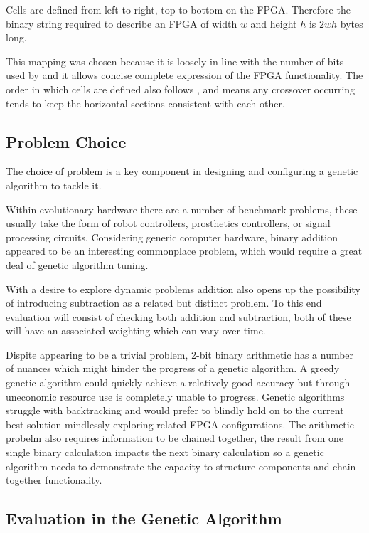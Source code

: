 Cells are defined from left to right, top to bottom on the FPGA. Therefore the
binary string required to describe an FPGA of width $w$ and height $h$ is $2wh$
bytes long.

This mapping was chosen because it is loosely in line with the number of bits
used by \cite{10.1007/3-540-63173-9_61} and it allows concise complete expression of
the FPGA functionality. The order in which cells are defined also follows
\cite{10.1007/3-540-63173-9_61}, and means any crossover occurring tends to keep
the horizontal sections consistent with each other.

\subsection{Problem Choice}

The choice of problem is a key component in designing and configuring a genetic
algorithm to tackle it.

Within evolutionary hardware there are a number of benchmark problems, these usually
take the form of robot controllers, prosthetics controllers, or signal processing
circuits. Considering generic computer hardware, binary addition appeared to be
an interesting commonplace problem, which would require a great deal of genetic algorithm tuning.

With a desire to explore dynamic problems addition also opens up the possibility of
introducing subtraction as a related but distinct problem. To this end evaluation
will consist of checking both addition and subtraction, both of these will have an
associated weighting which can
vary over time.

Dispite appearing to be a trivial problem, 2-bit binary arithmetic has a number of
nuances which might hinder the progress of a genetic algorithm. A greedy genetic
algorithm could quickly achieve a relatively good accuracy but through uneconomic
resource use is completely unable to progress. Genetic algorithms struggle with backtracking
and would prefer to blindly hold on to the current best solution mindlessly exploring
related FPGA configurations. The arithmetic probelm also requires information to be
chained together, the result from one single binary calculation impacts the next binary
calculation so a genetic algorithm needs to demonstrate the capacity to structure
components and chain together functionality.

\subsection{Evaluation in the Genetic Algorithm}

